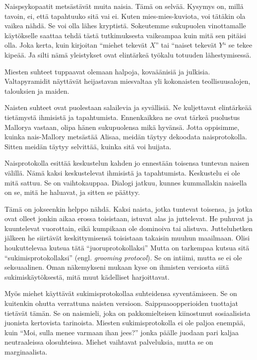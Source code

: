 Naispsykopaatit metsästävät muita naisia. Tämä on selvää. Kysymys on, millä tavoin, ei, että tapahtuuko sitä vai ei. Kuten mies-mies-kuviota, voi tätäkin ola vaikea nähdä. Se voi olla lähes kryptistä. Sokeutemme sukupuolen vinottamalle käytökselle saattaa tehdä tästä tutkimuksesta vaikeampaa kuin mitä sen pitäisi olla. Joka kerta, kuin kirjoitan ``miehet tekevät \(X\)'' tai ``naiset tekevät \(Y\)\vmq{,}`` se tekee kipeää. Ja silti nämä yleistykset ovat elintärkeä työkalu totuuden lähestymisessä.

Miesten suhteet tuppaavat olemaan halpoja, kovaäänisiä ja julkisia. Valtapyramidit näyttävät heijastavan miesvaltaa yli kokonaisten teollisuusalojen, talouksien ja maiden.

Naisten suhteet ovat puolestaan salailevia ja syvällisiä. Ne kuljettavat elintärkeää tietämystä ihmisistä ja tapahtumista. Ennenkaikkea ne ovat tärkeä puolustus Mallorya vastaan, olipa hänen sukupuolensa mikä hyvänsä. Jotta oppisimme, kuinka nais-Mallory metsästää Alisaa, meidän täytyy dekoodata naisprotokolla. Sitten meidän täytyy selvittää, kuinka sitä voi huijata.

Naisprotokolla esittää keskustelun kahden jo ennestään toisensa tuntevan naisen välillä. Nämä kaksi keskustelevat ihmisistä ja tapahtumista. Keskustelu ei ole mitä sattuu. Se on vaihtokauppaa. Dialogi jatkuu, kunnes kummallakin naisella on se, mitä he haluavat, ja sitten se päättyy.

Tämä on jokseenkin helppo nähdä. Kaksi naista, jotka tuntevat toisensa, ja jotka ovat olleet jonkin aikaa erossa toisistaan, istuvat alas ja juttelevat. He puhuvat ja kuuntelevat vuorottain, eikä kumpikaan ole dominoiva tai alistuva. Jutteluhetken jälkeen he siirtävät keskittymisensä toisistaan takaisin muuhun maailmaan. Olisi houkuttelevaa kutsua tätä ``juoruprotokollaksi'' Mutta on tarkempaa kutsua sitä ``sukimisprotokollaksi'' (engl. \emph{grooming protocol}). Se on intiimi, mutta se ei ole seksuaalinen. Oman näkemykseni mukaan kyse on ihmisten versiosta siitä sukimiskäytöksestä, mitä muut kädelliset harjoittavat.

Myös miehet käyttävät sukimisprotokollaa suhteidensa syventämiseen. Se on kuitenkin ohutta verrattuna naisten versioon. Saippuaoopperioiden tuottajat tietävät tämän. Se on naismieli, joka on pakkomielteisen kiinostunut sosiaalisista juonista kertovista tarinoista. Miesten sukimisprotokolla ei ole paljoa enempää, kuin ``Moi, sulla menee varmaan ihan jees?'' jonka päälle juodaan pari kaljaa neutraaleissa olosuhteissa. Miehet vaihtavat palveluksia, mutta se on marginaalista.

